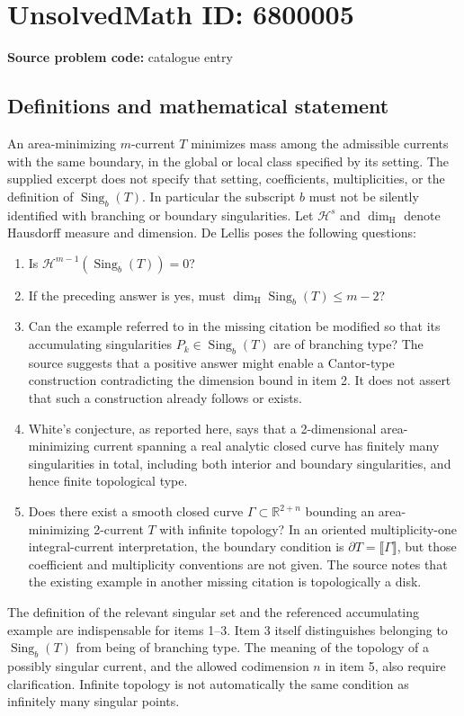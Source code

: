 \documentclass[11pt]{article}
\newcommand{\R}{\mathbb{R}}
\begin{document}
\section*{UnsolvedMath ID: 6800005}
\textbf{Source problem code:} catalogue entry
\subsection{Definitions and mathematical statement}
An area-minimizing \(m\)-current \(T\) minimizes mass among the admissible currents with the same boundary, in the global or local class specified by its setting. The supplied excerpt does not specify that setting, coefficients, multiplicities, or the definition of \(\operatorname{Sing}_b(T)\). In particular the subscript \(b\) must not be silently identified with branching or boundary singularities. Let \(\mathcal H^s\) and \(\dim_{\mathrm H}\) denote Hausdorff measure and dimension. De Lellis poses the following questions:
\begin{enumerate}
\item Is \(\mathcal H^{m-1}(\operatorname{Sing}_b(T))=0\)?
\item If the preceding answer is yes, must \(\dim_{\mathrm H}\operatorname{Sing}_b(T)\leq m-2\)?
\item Can the example referred to in the missing citation be modified so that its accumulating singularities \(P_k\in\operatorname{Sing}_b(T)\) are of branching type? The source suggests that a positive answer might enable a Cantor-type construction contradicting the dimension bound in item 2. It does not assert that such a construction already follows or exists.
\item White's conjecture, as reported here, says that a 2-dimensional area-minimizing current spanning a real analytic closed curve has finitely many singularities in total, including both interior and boundary singularities, and hence finite topological type.
\item Does there exist a smooth closed curve \(\Gamma\subset\R^{2+n}\) bounding an area-minimizing 2-current \(T\) with infinite topology? In an oriented multiplicity-one integral-current interpretation, the boundary condition is \(\partial T=\lBrack\Gamma\rBrack\), but those coefficient and multiplicity conventions are not given. The source notes that the existing example in another missing citation is topologically a disk.
\end{enumerate}
The definition of the relevant singular set and the referenced accumulating example are indispensable for items 1--3. Item 3 itself distinguishes belonging to \(\operatorname{Sing}_b(T)\) from being of branching type. The meaning of the topology of a possibly singular current, and the allowed codimension \(n\) in item 5, also require clarification. Infinite topology is not automatically the same condition as infinitely many singular points.
\end{document}
